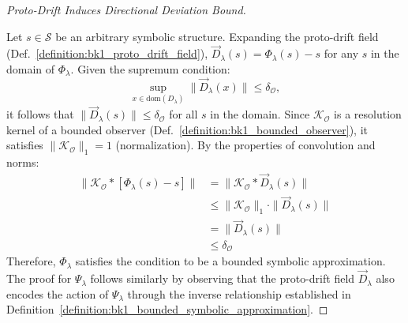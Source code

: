 \begin{proof}[Proto-Drift Induces Directional Deviation Bound]
\label{proof:bk1_drift_deviation_bound}
\leavevmode

Let $s \in \mathcal{S}$ be an arbitrary symbolic structure. Expanding the proto-drift field (Def.~\ref{definition:bk1_proto_drift_field}), $\vec{D}_\lambda(s) = \Phi_\lambda(s) - s$ for any $s$ in the domain of $\Phi_\lambda$. Given the supremum condition:
\[
\sup_{x \in \mathrm{dom}(D_\lambda)} \|\vec{D}_\lambda(x)\| \leq \delta_\mathcal{O},
\]
it follows that $\|\vec{D}_\lambda(s)\| \leq \delta_\mathcal{O}$ for all $s$ in the domain.
Since $\mathcal{K}_\mathcal{O}$ is a resolution kernel of a bounded observer (Def.~\ref{definition:bk1_bounded_observer}), it satisfies $\|\mathcal{K}_\mathcal{O}\|_1 = 1$ (normalization). By the properties of convolution and norms:
\begin{align}
\|\mathcal{K}_\mathcal{O} \ast [\Phi_\lambda(s) - s]\| &= \|\mathcal{K}_\mathcal{O} \ast \vec{D}_\lambda(s)\| \\
&\leq \|\mathcal{K}_\mathcal{O}\|_1 \cdot \|\vec{D}_\lambda(s)\| \\
&= \|\vec{D}_\lambda(s)\| \\
&\leq \delta_\mathcal{O}
\end{align}
Therefore, $\Phi_\lambda$ satisfies the condition to be a bounded symbolic approximation. The proof for $\Psi_\lambda$ follows similarly by observing that the proto-drift field $\vec{D}_\lambda$ also encodes the action of $\Psi_\lambda$ through the inverse relationship established in Definition~\ref{definition:bk1_bounded_symbolic_approximation}.
\end{proof}

